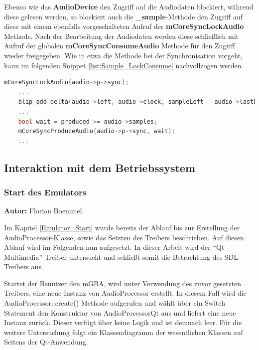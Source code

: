 \documentclass[11pt,a4paper]{scrartcl}
\newcommand{\AutorFlorian} {
    \vspace{-4mm}
    \large \textbf{Autor:} Florian Boemmel \normalsize
    \vspace{2mm}
}
\begin{document}
Ebenso wie das \textbf{AudioDevice} den Zugriff auf die Audiodaten blockiert, w\"ahrend diese gelesen werden, so blockiert auch die \textbf{{\_}sample}-Methode den Zugriff auf diese mit einem ebenfalls vorgeschalteten Aufruf der \textbf{mCoreSyncLockAudio} Methode. Nach der Bearbeitung der Audiodaten werden diese schlie{\ss}lich mit Aufruf der globalen \textbf{mCoreSyncConsumeAudio} Methode f\"ur den Zugriff wieder freigegeben. Wie in etwa die Methode bei der Synchronisation vorgeht, kann im folgenden Snippet \ref{list:Sample_LockConsume} nachvollzogen werden.

\vspace{5mm}
\begin{lstlisting}[language=C++, caption={{\_}sample - \enquote{Lock / Consume}}, label={list:Sample_LockConsume}]
	mCoreSyncLockAudio(audio->p->sync);
    ...
    blip_add_delta(audio->left, audio->clock, sampleLeft - audio->lastLeft);
    ...	
	bool wait = produced >= audio->samples;
	mCoreSyncProduceAudio(audio->p->sync, wait);
	...
\end{lstlisting}



\newpage

\subsection{Interaktion mit dem Betriebssystem}

\subsubsection{Start des Emulators}
\AutorFlorian

Im Kapitel \ref{Emulator_Start} wurde bereits der Ablauf bis zur Erstellung der AudioProcessor-Klasse, sowie das Setzten des Treibers beschrieben. Auf diesen Ablauf wird im Folgenden nun aufgesetzt. In dieser Arbeit
wird der \enquote{Qt Multimedia} Treiber untersucht und schlie{\ss}t somit die Betrachtung des SDL-Treibers aus.

Startet der Benutzer den mGBA, wird unter Verwendung des zuvor gesetzten Treibers, eine neue Instanz von AudioProcessor erstellt. In diesem Fall wird die AudioProcessor::create() Methode aufgerufen und w\"ahlt \"uber ein Switch Statement den Konstruktor von AudioProcessorQt aus und liefert eine neue Instanz zur\"uck. Dieser verf\"ugt \"uber keine Logik und ist demnach leer. F\"ur die weitere Untersuchung folgt ein Klassendiagramm der wesentlichen Klassen auf Seitens der Qt-Anwendung.
\end{document}
